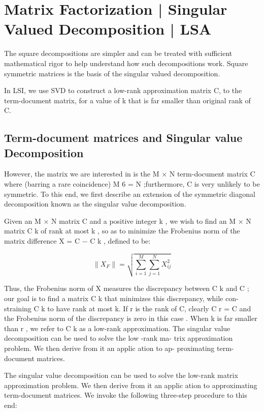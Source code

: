 \section{Matrix Factorization | Singular Valued Decomposition | LSA }
The square decompositions are simpler and can be treated with sufficient mathematical rigor to help understand how such decompositions work. Square symmetric matrices is the basis of the singular valued decomposition.

In LSI, we use SVD to construct a low-rank approximation matrix C, to the term-document matrix, for a value of k that is far smaller than original rank of C. 

\subsection{Term-document matrices and Singular value Decomposition}
However, the matrix we are interested in is the M × N term-document matrix C where (barring a rare coincidence) M 6 = N ;furthermore, C is very unlikely to be symmetric. To this end, we first describe an extension of the symmetric diagonal decomposition known as the singular value decomposition.

Given an M × N matrix C and  a positive  integer k ,  we  wish  to  find  an M × N matrix C k of rank at most k , so as to minimize the Frobenius norm of the matrix difference X = C − C k , defined to be:

\[
    \| X_{F} \| = \sqrt{\sum_{i=1}^{M} \sum_{j=1}^{N} X_{ij}^2}
\]

Thus, the Frobenius norm of X measures the discrepancy between C k and C ; our goal is to find a matrix C k that minimizes this discrepancy, while con- straining C k to have rank at most k. If r is the  rank of C, clearly C r = C and the Frobenius norm of the discrepancy is zero in this case . When k is far smaller than r , we refer to C k as a low-rank approximation. The singular value decomposition can be used to solve the low -rank ma- trix approximation problem.   We then derive from it an applic ation to ap- proximating term-document matrices.

The singular value decomposition can be used to solve the low-rank matrix approximation problem. We then derive from it an applic ation to approximating term-document matrices. We invoke the following three-step procedure to this end:

